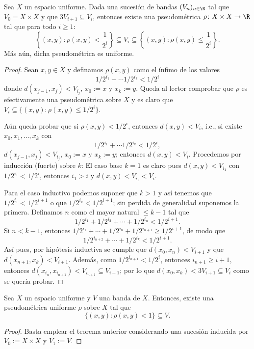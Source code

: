 \documentclass[topologia-analisis.tex]{subfiles}
\begin{document}
\begin{thm}\label{thm:uniformity_pseudometric}
	Sea $X$ un espacio uniforme.
	Dada una sucesión de bandas $(V_n)_{n\in\N}$ tal que $V_0 = X \times X$ y que $3V_{i+1} \subseteq V_i$, entonces existe una pseudométrica
	$\rho\colon X\times X \to \R$ tal que para todo $i\ge 1$:
	$$ \left\{ (x, y) : \rho(x, y) < \frac{1}{2^i} \right\} \subseteq V_i \subseteq \left\{ (x, y) : \rho(x, y) \le \frac{1}{2^i} \right\}. $$
	Más aún, dicha pseudométrica es uniforme.
\end{thm}
\begin{proof}
	Sean $x, y \in X$ y definamos $\rho(x, y)$ como el ínfimo de los valores
	$$ 1/2^{i_1} + \cdots 1/2^{i_k} < 1/2^i $$
	donde $d(x_{j-1}, x_j) < V_{i_j}$, $x_0 := x$ y $x_k := y$.
	Queda al lector comprobar que $\rho$ es efectivamente una pseudométrica sobre $X$ y es claro que $V_i \subseteq \{ (x, y) : \rho(x, y) \le 1/2^i \}$.

	Aún queda probar que si $\rho(x, y) < 1/2^i$, entonces $d(x, y) < V_i$, i.e., si existe
	$x_0, x_1, \dots, x_k$ con
	$$ 1/2^{i_1} + \cdots 1/2^{i_k} < 1/2^i, $$
	$d(x_{j-1}, x_j) < V_{i_j}$, $x_0 := x$ y $x_k := y$; entonces $d(x, y) < V_i$.
	Procedemos por inducción (fuerte) sobre $k$:
	El caso base $k = 1$ es claro pues $d(x, y) < V_{i_1}$ con $1/2^{i_1} < 1/2^i$, entonces $i_1 > i$ y $d(x, y) < V_{i_1} < V_i$.

	Para el caso inductivo podemos suponer que $k > 1$ y así tenemos que $1/2^{i_1} < 1/2^{i+1}$ o que $1/2^{i_k} < 1/2^{i+1}$; sin perdida de generalidad
	suponemos la primera. Definamos $n$ como el mayor natural $\le k-1$ tal que
	$$ 1/2^{i_1} + 1/2^{i_2} + \cdots + 1/2^{i_n} < 1/2^{i+1}. $$
	Si $n < k-1$, entonces $1/2^{i_1} + \cdots + 1/2^{i_n} + 1/2^{i_{n+1}} \ge 1/2^{i+1}$, de modo que
	$$ 1/2^{i_{n+2}} + \cdots + 1/2^{i_k} < 1/2^{i+1}. $$
	Así pues, por hipótesis inductiva se cumple que $d(x_0, x_n) < V_{i+1}$ y que $d(x_{n+1}, x_k) < V_{i+1}$.
	Además, como $1/2^{i_{n+1}} < 1/2^i$, entonces $i_{n+1} \ge i+1$, entonces $d(x_{i_n}, x_{i_{n+1}}) < V_{i_{n+1}} \subseteq V_{i+1}$;
	por lo que $d(x_0, x_k) < 3V_{i+1} \subseteq V_i$ como se quería probar.
\end{proof}

\begin{cor}
	Sea $X$ un espacio uniforme y $V$ una banda de $X$.
	Entonces, existe una pseudométrica uniforme $\rho$ sobre $X$ tal que
	$$ \{ (x, y) : \rho(x, y) < 1 \} \subseteq V. $$
\end{cor}
\begin{proof}
	Basta emplear el teorema anterior considerando una sucesión inducida por $V_0 := X\times X$ y $V_1 := V$.
\end{proof}
\end{document}
